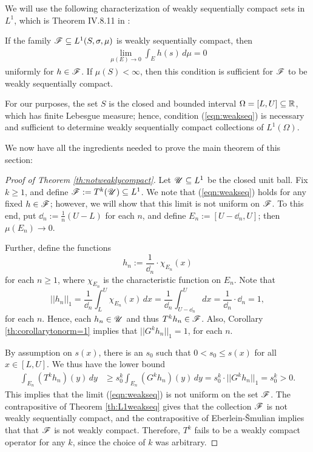 We will use the following characterization of weakly sequentially compact sets in $L^1$, which is Theorem IV.8.11 in \cite{Dunford1958}:

\begin{theorem} \label{th:L1weakseq}
	If the family $\mathscr F \subseteq L^1(S, \sigma, \mu)$ is weakly sequentially compact, then
	\begin{align}
		\lim_{\mu(E) \to 0} \int_E h(s) \, d\mu =0 \label{eqn:weakseq}
	\end{align}
	uniformly for $h \in \mathscr F$. If $\mu(S) < \infty$, then this condition is sufficient for $\mathscr F$ to be weakly sequentially compact.
\end{theorem}

For our purposes, the set $S$ is the closed and bounded interval $\Omega = [L,U] \subseteq \mathbb{R}$, which has finite Lebesgue measure; hence, condition (\ref{eqn:weakseq}) is necessary and sufficient to determine weakly sequentially compact collections of $L^1(\Omega)$.

We now have all the ingredients needed to prove the main theorem of this section:

\begin{proof}[Proof of Theorem \ref{th:notweaklycompact}]
	Let $\mathscr  U \subseteq L^1$ be the closed unit ball. Fix $k \geq 1$, and define $\mathscr F:=T^k(\mathscr U) \subseteq L^1$. We note that (\ref{eqn:weakseq}) holds for any fixed $h \in \mathscr F$; however, we will show that this limit is not uniform on $\mathscr F$. To this end, put $\dd_n:= \frac 1n (U-L)$ for each $n$, and define $E_n:=[U-\dd_n,U]$; then $\mu(E_n) \to 0$.
	
	Further, define the functions
	\[h_n:= \frac{1}{\dd_n} \cdot \chi_{E_n}(x)\]
	for each $n \geq 1$, where $\chi_{E_n}$ is the characteristic function on $E_n$. Note that
	\[||h_n||_1 = \frac{1}{\dd_n} \int_L^U \chi_{E_n}(x) \, dx = \frac{1}{\dd_n} \int_{U-\dd_n}^U dx = \frac{1}{\dd_n} \cdot \dd_n = 1,\]
	for each $n$. Hence, each $h_n \in \mathscr U$ and thus $T^kh_n \in \mathscr F$. Also, Corollary \ref{th:corollarytonorm=1} implies that $||G^k h_n||_1 = 1$, for each $n$.
	
	By assumption on $s(x)$, there is an $s_0$ such that $0 < s_0 \leq s(x)$ for all $x \in [L,U]$. We thus have the lower bound
	\begin{align*}
		\int_{E_n} (T^k h_n)(y) \, dy &\geq s_0^k \int_{E_n} (G^k h_n)(y) \, dy = s_0 ^k \cdot ||G^k h_n||_1 = s_0^k > 0.
	\end{align*}
	This implies that the limit (\ref{eqn:weakseq}) is not uniform on the set $\mathscr F$. The contrapositive of Theorem \ref{th:L1weakseq} gives that the collection $\mathscr F$ is not weakly sequentially compact, and the contrapositive of Eberlein-\v{S}mulian implies that that $\mathscr F$ is not weakly compact. Therefore, $T^k$ fails to be a weakly compact operator for any $k$, since the choice of $k$ was arbitrary.
	
\end{proof}

